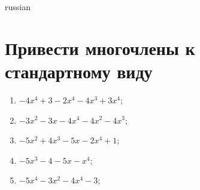 \documentclass[a4paper]{article}
\begin{document}
\begin{otherlanguage*}{russian}

\section{Привести многочлены к стандартному виду}
\begin{enumerate}
\item $-4x^{4} + 3 - 2x^{4} - 4x^{3} + 3x^{4}$;
\item $-3x^{2} - 3x - 4x^{4} - 4x^{2} - 4x^{3}$;
\item $-5x^{2} + 4x^{3} - 5x - 2x^{4} + 1$;
\item $-5x^{3} - 4 - 5x - x^{4}$;
\item $-5x^{4} - 3x^{2} - 4x^{4} - 3$;
\end{enumerate}
\end{otherlanguage*}
\end{document}
